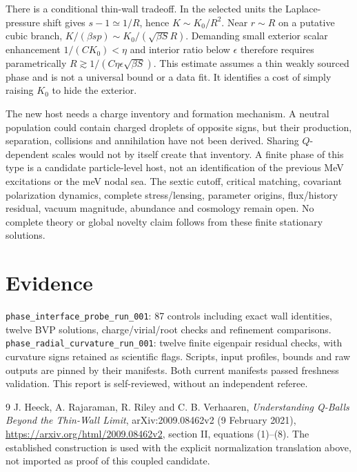 \documentclass[11pt]{article}
\begin{document}
There is a conditional thin-wall tradeoff. In the selected units the
Laplace-pressure shift gives $s-1\simeq1/R$, hence $K\sim K_0/R^2$.
Near $r\sim R$ on a putative cubic branch,
$K/(\beta s p)\sim K_0/(\sqrt{\beta S}R)$. Demanding small exterior
scalar enhancement $1/(CK_0)<\eta$ and interior ratio below $\epsilon$
therefore requires parametrically
$R\gtrsim1/(C\eta\epsilon\sqrt{\beta S})$. This estimate assumes a
thin weakly sourced phase and is not a universal bound or a data fit.
It identifies a cost of simply raising $K_0$ to hide the exterior.

The new host needs a charge inventory and formation mechanism. A neutral
population could contain charged droplets of opposite signs, but their
production, separation, collisions and annihilation have not been derived.
Sharing $Q$-dependent scales would not by itself create that inventory.
A finite phase of this type is a candidate particle-level host, not an
identification of the previous MeV excitations or the meV nodal sea.
The sextic cutoff, critical matching, covariant polarization dynamics,
complete stress/lensing, parameter origins, flux/history residual, vacuum
magnitude, abundance and cosmology remain open. No complete theory or
global novelty claim follows from these finite stationary solutions.

\section{Evidence}
\texttt{phase\_interface\_probe\_run\_001}: 87 controls including exact
wall identities, twelve BVP solutions, charge/virial/root checks and
refinement comparisons. \texttt{phase\_radial\_curvature\_run\_001}:
twelve finite eigenpair residual checks, with curvature signs retained as
scientific flags. Scripts, input profiles, bounds and raw outputs are pinned
by their manifests. Both current manifests passed freshness validation.
This report is self-reviewed, without an independent referee.

\begin{thebibliography}{9}
 J. Heeck, A. Rajaraman, R. Riley and C. B. Verhaaren,
\emph{Understanding Q-Balls Beyond the Thin-Wall Limit},
arXiv:2009.08462v2 (9 February 2021),
\url{https://arxiv.org/html/2009.08462v2}, section II, equations (1)--(8).
The established construction is used with the explicit normalization
translation above, not imported as proof of this coupled candidate.
\end{thebibliography}
\end{document}
